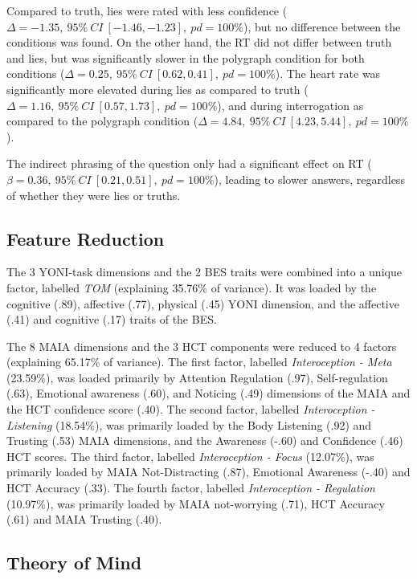 \documentclass[
  man,floatsintext]{apa6}
\begin{document}
Compared to truth, lies were rated with less confidence (\(\Delta=-1.35,~95\%~CI~[-1.46, -1.23],~pd = 100\%\)), but no difference between the conditions was found. On the other hand, the RT did not differ between truth and lies, but was significantly slower in the polygraph condition for both conditions (\(\Delta=0.25,~95\%~CI~[0.62, 0.41],~pd = 100\%\)). The heart rate was significantly more elevated during lies as compared to truth (\(\Delta=1.16,~95\%~CI~[0.57, 1.73],~pd = 100\%\)), and during interrogation as compared to the polygraph condition (\(\Delta=4.84 ,~95\%~CI~[4.23, 5.44],~pd = 100\%\)).

The indirect phrasing of the question only had a significant effect on RT (\(\beta=0.36,~95\%~CI~[0.21, 0.51],~pd = 100\%\)), leading to slower answers, regardless of whether they were lies or truths.

\hypertarget{feature-reduction}{%
\subsection{Feature Reduction}\label{feature-reduction}}

The 3 YONI-task dimensions and the 2 BES traits were combined into a unique factor, labelled \emph{TOM} (explaining 35.76\% of variance). It was loaded by the cognitive (.89), affective (.77), physical (.45) YONI dimension, and the affective (.41) and cognitive (.17) traits of the BES.

The 8 MAIA dimensions and the 3 HCT components were reduced to 4 factors (explaining 65.17\% of variance). The first factor, labelled \emph{Interoception - Meta} (23.59\%), was loaded primarily by Attention Regulation (.97), Self-regulation (.63), Emotional awareness (.60), and Noticing (.49) dimensions of the MAIA and the HCT confidence score (.40). The second factor, labelled \emph{Interoception - Listening} (18.54\%), was primarily loaded by the Body Listening (.92) and Trusting (.53) MAIA dimensions, and the Awareness (-.60) and Confidence (.46) HCT scores. The third factor, labelled \emph{Interoception - Focus} (12.07\%), was primarily loaded by MAIA Not-Distracting (.87), Emotional Awareness (-.40) and HCT Accuracy (.33). The fourth factor, labelled \emph{Interoception - Regulation} (10.97\%), was primarily loaded by MAIA not-worrying (.71), HCT Accuracy (.61) and MAIA Trusting (.40).

\hypertarget{theory-of-mind-1}{%
\subsection{Theory of Mind}\label{theory-of-mind-1}}
\end{document}
